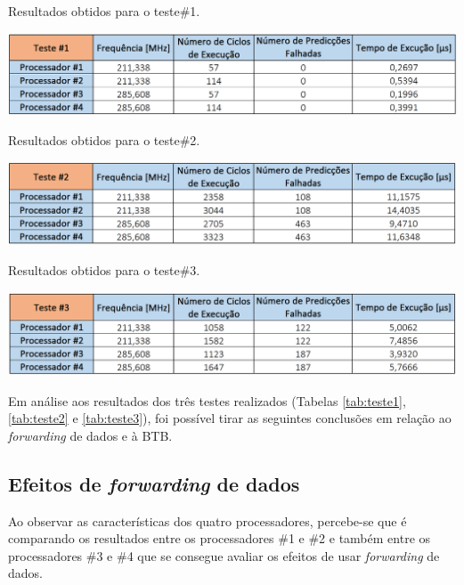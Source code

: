 \documentclass[11pt]{article}
\numberwithin{equation}{section}
\begin{document}
\begin{table}[H]
	\centering
	\caption{Resultados obtidos para o teste$\#$1.}
	\vspace{-1.5mm}
	\includegraphics[keepaspectratio=true, scale=0.40]{tabelas/teste1}
	\label{tab:teste1}
\end{table}

\begin{table}[H]
	\centering
	\caption{Resultados obtidos para o teste$\#$2.}
	\vspace{-1.5mm}
	\includegraphics[keepaspectratio=true, scale=0.40]{tabelas/teste2}
	\label{tab:teste2}
\end{table}

\begin{table}[H]
	\centering
	\caption{Resultados obtidos para o teste$\#$3.}
	\vspace{-1.5mm}
	\includegraphics[keepaspectratio=true, scale=0.40]{tabelas/teste3}
	\label{tab:teste3}
\end{table}

Em análise aos resultados dos três testes realizados (Tabelas \ref{tab:teste1}, \ref{tab:teste2} e \ref{tab:teste3}), foi possível tirar as seguintes conclusões em relação ao \textit{forwarding} de dados e à BTB.

\subsection{Efeitos de \textit{forwarding} de dados}

Ao observar as características dos quatro processadores, percebe-se que é comparando os resultados entre os processadores \#1 e \#2 e também entre os processadores \#3 e \#4 que se consegue avaliar os efeitos de usar \textit{forwarding} de dados.
\end{document}
